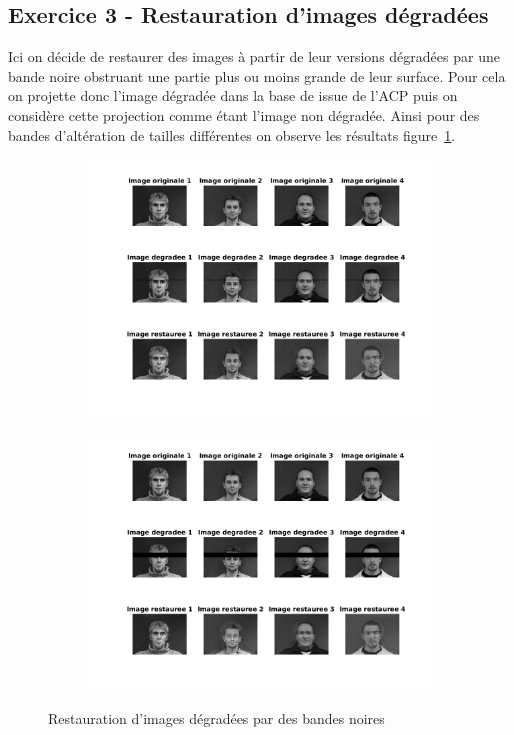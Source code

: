 \documentclass{article}
\begin{document}
\subsection{Exercice 3 - Restauration d'images dégradées}
Ici on décide de restaurer des images à partir de leur versions dégradées par une bande noire obstruant une partie plus ou moins grande de leur surface. Pour cela on projette donc l'image dégradée dans la base de issue de l'ACP puis on considère cette projection comme étant l'image non dégradée. Ainsi pour des bandes d'altération de tailles différentes on observe les résultats figure~\ref{reconstitution_bandes_noires}.
\begin{figure}[ht]
    \centering
    \begin{subfigure}[c]{0.7\linewidth}
        \centering
        \includegraphics[width=\linewidth]{images/2-bande_5.png}
    \end{subfigure}
    \begin{subfigure}[c]{0.7\linewidth}
        \centering
        \includegraphics[width=\linewidth]{images/2-bande_30.png}
    \end{subfigure}
    \caption{Restauration d'images dégradées par des bandes noires}
    \label{reconstitution_bandes_noires}
\end{figure}
\end{document}

